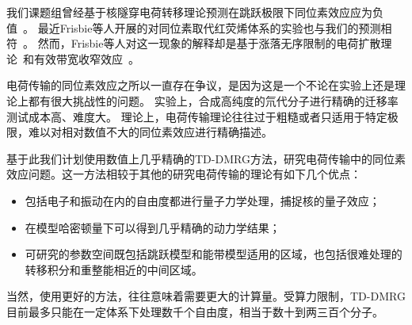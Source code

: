 \documentclass{article}
\begin{document}
我们课题组曾经基于核隧穿电荷转移理论预测在跳跃极限下同位素效应应为负值~\cite{NAN09, Jiang14, Jiang15, Jiang18}。
最近Frisbie等人开展的对同位素取代红荧烯体系的实验也与我们的预测相符~\cite{Ren17}。
然而，Frisbie等人对这一现象的解释却是基于涨落无序限制的电荷扩散理论~\cite{Fratini16, Troisi06}和有效带宽收窄效应~\cite{Hann041}。

电荷传输的同位素效应之所以一直存在争议，是因为这是一个不论在实验上还是理论上都有很大挑战性的问题。
实验上，合成高纯度的氘代分子进行精确的迁移率测试成本高、难度大。
理论上，电荷传输理论往往过于粗糙或者只适用于特定极限，难以对相对数值不大的同位素效应进行精确描述。

基于此我们计划使用数值上几乎精确的TD-DMRG方法，研究电荷传输中的同位素效应问题。这一方法相较于其他的研究电荷传输的理论有如下几个优点：
\begin{itemize}
    \item 包括电子和振动在内的自由度都进行量子力学处理，捕捉核的量子效应；
    \item 在模型哈密顿量下可以得到几乎精确的动力学结果；
    \item 可研究的参数空间既包括跳跃模型和能带模型适用的区域，也包括很难处理的转移积分和重整能相近的中间区域。
\end{itemize}

当然，使用更好的方法，往往意味着需要更大的计算量。受算力限制，TD-DMRG目前最多只能在一定体系下处理数千个自由度，相当于数十到两三百个分子。
\end{document}
